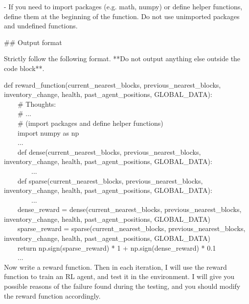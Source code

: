 - If you need to import packages (e.g. math, numpy) or define helper functions, define them at the beginning of the function. Do not use unimported packages and undefined functions.



\#\# Output format

Strictly follow the following format. **Do not output anything else outside the code block**.





def reward\_function(current\_nearest\_blocks, previous\_nearest\_blocks, inventory\_change, health, past\_agent\_positions, GLOBAL\_DATA):
\\
\hbox{\ \ \ \ }\# Thoughts:\\
\hbox{\ \ \ \ }\# ...\\
\hbox{\ \ \ \ }\# (import packages and define helper functions)\\
\hbox{\ \ \ \ }import numpy as np\\
\hbox{\ \ \ \ }...\\
\hbox{\ \ \ \ }def dense(current\_nearest\_blocks, previous\_nearest\_blocks, inventory\_change, health, past\_agent\_positions, GLOBAL\_DATA):\\
\hbox{\ \ \ \ \ \ \ \ }...\\
\hbox{\ \ \ \ }def sparse(current\_nearest\_blocks, previous\_nearest\_blocks, inventory\_change, health, past\_agent\_positions, GLOBAL\_DATA):\\
\hbox{\ \ \ \ \ \ \ \ }...\\
\hbox{\ \ \ \ }dense\_reward = dense(current\_nearest\_blocks, previous\_nearest\_blocks, inventory\_change, health, past\_agent\_positions, GLOBAL\_DATA)\\
\hbox{\ \ \ \ }sparse\_reward = sparse(current\_nearest\_blocks, previous\_nearest\_blocks, inventory\_change, health, past\_agent\_positions, GLOBAL\_DATA)\\
\hbox{\ \ \ \ }return np.sign(sparse\_reward) * 1 + np.sign(dense\_reward) * 0.1\\
\hbox{\ \ \ \ }...\\
Now write a reward function. Then in each iteration, I will use the reward function to train an RL agent, and test it in the environment. I will give you possible reasons of the failure found during the testing, and you should modify the reward function accordingly. 


